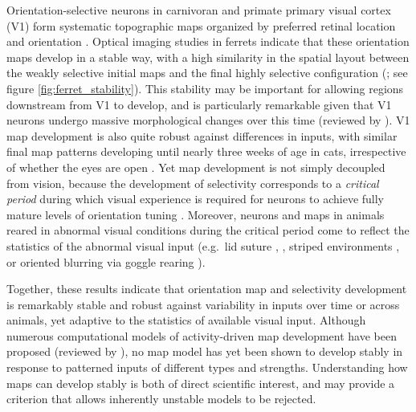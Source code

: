 \documentclass{article}
\begin{document}
Orientation-selective neurons in carnivoran and primate primary visual
cortex (V1) form systematic topographic maps organized by preferred
retinal location and orientation
\citep{Blasdel1992a,Blasde1992b,Kaschube2010}.  Optical imaging
studies in ferrets indicate that these orientation maps develop in a
stable way, with a high similarity
in the spatial layout between the weakly selective
initial maps and the final highly selective configuration
(\citealp{Chapman1996,Chapman1998,Godecke1997}; see figure
\ref{fig:ferret_stability}).  This stability
may be important for allowing regions downstream
from V1 to develop, and is particularly remarkable given that
V1 neurons undergo massive morphological changes over this
time (reviewed by \citealp{White2007,Huberman2008}).  V1 map
development is also
quite robust against differences in inputs, with similar final map
patterns developing until nearly three weeks of age in cats,
irrespective of whether the eyes are open \citep{Crair1998}.  Yet map
development is not simply decoupled from vision, because
the development of selectivity corresponds to a
\emph{critical period} during which visual experience is required for
neurons to achieve fully mature levels of orientation tuning
\citep{White2007,White2001b,Crair1998,chapman:jn00}. Moreover,
neurons and maps in animals reared in abnormal visual conditions during the
critical period come to reflect the statistics of the abnormal visual
input (e.g.\ lid suture , \citep{Blakemore1975,White2001b,wiesel:jnp63},
striped environments \citep{Blakemore1970,Sengpiel1999},
or oriented blurring via goggle
rearing \citep{Tanaka2006,Tanaka2009}).

Together, these results indicate that orientation map and selectivity
development is remarkably stable and robust against variability in
inputs over time or across animals, yet adaptive to the statistics of
available visual input.  Although numerous computational models of
activity-driven map development have been proposed (reviewed by
\citealp{Swindale1996,goodhill:neuron07}), no map model has yet been
shown to develop stably in response to patterned inputs of different
types and strengths.  Understanding how maps can develop stably is
both of direct scientific interest, and may provide a criterion that
allows inherently unstable models to be rejected.
\end{document}
